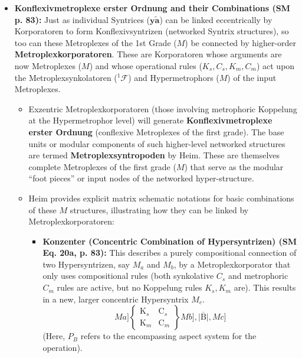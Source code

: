 \documentclass[12pt]{article}
\newcommand{\q}[1]{\enquote{#1}}
\newcommand{\syntrix}{\bm{y\widetilde{a}}}
\newcommand{\aspektivsystem}{P}
\def\metroplex#1#2{M}%
\newcommand{\hypersyntrix}{\metroplex{1}{F}}
\newcommand{\hypermetrophor}[1]{%
  \metroplex{#1}{a}%
}
\newcommand{\metroplexsynkolator}[1]{{}^{#1}\mathcal{F}}
\begin{document}
\begin{itemize}
    \item \textbf{Konflexivmetroplexe erster Ordnung and their Combinations (SM p. 83):}
    Just as individual Syntrices (\(\syntrix\)) can be linked eccentrically by Korporatoren to form Konflexivsyntrizen (networked Syntrix structures), so too can these Metroplexes of the 1st Grade (\(\hypersyntrix\)) be connected by higher-order \textbf{Metroplexkorporatoren}. These are Korporatoren whose arguments are now Metroplexes (\(\hypersyntrix\)) and whose operational rules (\(K_s, C_s, K_m, C_m\)) act upon the Metroplexsynkolatoren (\(\metroplexsynkolator{1}\)) and Hypermetrophors (\(\hypermetrophor{1}\)) of the input Metroplexes.
    \begin{itemize}
        \item Exzentric Metroplexkorporatoren (those involving metrophoric Koppelung at the Hypermetrophor level) will generate \textbf{Konflexivmetroplexe erster Ordnung} (conflexive Metroplexes of the first grade). The base units or modular components of such higher-level networked structures are termed \textbf{Metroplexsyntropoden} by Heim. These are themselves complete Metroplexes of the first grade (\(\hypersyntrix\)) that serve as the modular \q{foot pieces} or input nodes of the networked hyper-structure.
        \item Heim provides explicit matrix schematic notations for basic combinations of these \( \hypersyntrix \) structures, illustrating how they can be linked by Metroplexkorporatoren:
        \begin{itemize}
            \item \textbf{Konzenter (Concentric Combination of Hypersyntrizen) (SM Eq. 20a, p. 83):} This describes a purely compositional connection of two Hypersyntrizen, say \( \hypersyntrix_a \) and \( \hypersyntrix_b \), by a Metroplexkorporator that only uses compositional rules (both synkolative \( C_s \) and metrophoric \( C_m \) rules are active, but no Koppelung rules \(K_s, K_m\) are). This results in a new, larger concentric Hypersyntrix \( \hypersyntrix_c \).
            \begin{equation}
            \metroplex{1}[a] \left\{ \begin{smallmatrix} \mathrm{K}_s & \mathrm{C}_s \\ \mathrm{K}_m & \mathrm{C}_m \end{smallmatrix} \right\} \metroplex{1}[b], \overline{|\mathrm{B}|}, \metroplex{1}[c]
            \tag{20a}
            \end{equation}
            (Here, \( \aspektivsystem_B \) refers to the encompassing aspect system for the operation).

\end{itemize}
\end{itemize}
\end{itemize}
\end{document}
